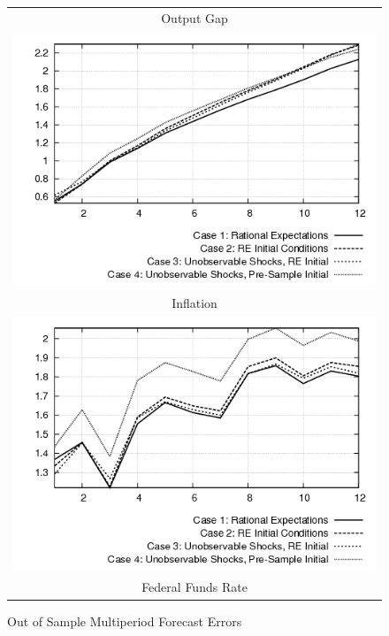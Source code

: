 \begin{figure}
\caption{Out of Sample Multiperiod Forecast Errors}\label{fg:rmse}
\vspace*{1pc}
\begin{center}
\begin{tabular}{c}
Output Gap \\ 
\includegraphics[scale=0.55]{output_fore.png} \\ 
Inflation \\ 
\includegraphics[scale=0.55]{inflation_fore.png} \\ 
Federal Funds Rate \\ 

\end{tabular}
\end{center}
\end{figure}
